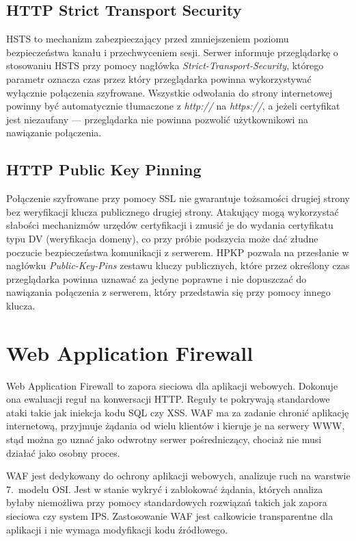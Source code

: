 \documentclass[11pt,a4paper,polish,thesis]{dcsbook}
\begin{document}
\subsection{HTTP Strict Transport Security}
HSTS to mechanizm zabezpieczający przed zmniejszeniem poziomu bezpieczeństwa kanału i przechwyceniem sesji. Serwer informuje przeglądarkę o stosowaniu HSTS przy pomocy nagłówka \textit{Strict-Transport-Security}, którego parametr oznacza czas przez który przeglądarka powinna wykorzystywać wyłącznie połączenia szyfrowane. Wszystkie odwołania do strony internetowej powinny być automatycznie tłumaczone z \textit{http://} na \textit{https://}, a jeżeli certyfikat jest niezaufany --- przeglądarka nie powinna pozwolić użytkownikowi na nawiązanie połączenia.

\subsection{HTTP Public Key Pinning}
Połączenie szyfrowane przy pomocy SSL nie gwarantuje tożsamości drugiej strony bez weryfikacji klucza publicznego drugiej strony. Atakujący mogą wykorzystać słabości mechanizmów urzędów certyfikacji i zmusić je do wydania certyfikatu typu DV (weryfikacja domeny), co przy próbie podszycia może dać złudne poczucie bezpieczeństwa komunikacji z serwerem. HPKP pozwala na przesłanie w nagłówku \textit{Public-Key-Pins} zestawu kluczy publicznych, które przez określony czas przeglądarka powinna uznawać za jedyne poprawne i nie dopuszczać do nawiązania połączenia z serwerem, który przedstawia się przy pomocy innego klucza.

\section{Web Application Firewall}
\label{waf}
Web Application Firewall to zapora sieciowa dla aplikacji webowych. Dokonuje ona ewaluacji reguł na konwersacji HTTP. Reguły te pokrywają standardowe ataki takie jak iniekcja kodu SQL czy XSS. WAF ma za zadanie chronić aplikację internetową, przyjmuje żądania od wielu klientów i kieruje je na serwery WWW, stąd można go uznać jako odwrotny serwer pośredniczący, chociaż nie musi działać jako osobny proces.

WAF jest dedykowany do ochrony aplikacji webowych, analizuje ruch na warstwie 7.~modelu OSI. Jest w stanie wykryć i zablokować żądania, których analiza byłaby niemożliwa przy pomocy standardowych rozwiązań takich jak zapora sieciowa czy system IPS. Zastosowanie WAF jest całkowicie transparentne dla aplikacji i nie wymaga modyfikacji kodu źródłowego.
\end{document}
